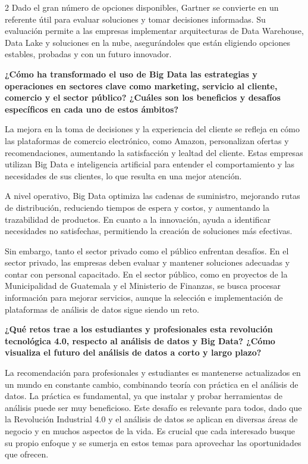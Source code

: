 \documentclass[12pt,spanish,Letterpaper,openany]{book}
\begin{document}
\begin {multicols}{2}
Dado el gran número de opciones disponibles, Gartner se convierte en un referente útil para evaluar soluciones y tomar decisiones informadas. Su evaluación permite a las empresas implementar arquitecturas de Data Warehouse, Data Lake y soluciones en la nube, asegurándoles que están eligiendo opciones estables, probadas y con un futuro innovador.

\textbf{¿Cómo ha transformado el uso de Big Data las estrategias y operaciones en sectores clave como marketing, servicio al cliente, comercio y el sector público? ¿Cuáles son los beneficios y desafíos específicos en cada uno de estos ámbitos?}

La mejora en la toma de decisiones y la experiencia del cliente se refleja en cómo las plataformas de comercio electrónico, como Amazon, personalizan ofertas y recomendaciones, aumentando la satisfacción y lealtad del cliente. Estas empresas utilizan Big Data e inteligencia artificial para entender el comportamiento y las necesidades de sus clientes, lo que resulta en una mejor atención.

A nivel operativo, Big Data optimiza las cadenas de suministro, mejorando rutas de distribución, reduciendo tiempos de espera y costos, y aumentando la trazabilidad de productos. En cuanto a la innovación, ayuda a identificar necesidades no satisfechas, permitiendo la creación de soluciones más efectivas.

Sin embargo, tanto el sector privado como el público enfrentan desafíos. En el sector privado, las empresas deben evaluar y mantener soluciones adecuadas y contar con personal capacitado. En el sector público, como en proyectos de la Municipalidad de Guatemala y el Ministerio de Finanzas, se busca procesar información para mejorar servicios, aunque la selección e implementación de plataformas de análisis de datos sigue siendo un reto.

\textbf{¿Qué retos trae a los estudiantes y profesionales esta revolución tecnológica 4.0, respecto al análisis de datos y Big Data? ¿Cómo visualiza el futuro del análisis de datos a corto y largo plazo?}

La recomendación para profesionales y estudiantes es mantenerse actualizados en un mundo en constante cambio, combinando teoría con práctica en el análisis de datos. La práctica es fundamental, ya que instalar y probar herramientas de análisis puede ser muy beneficioso. Este desafío es relevante para todos, dado que la Revolución Industrial 4.0 y el análisis de datos se aplican en diversas áreas de negocio y en muchos aspectos de la vida. Es crucial que cada interesado busque su propio enfoque y se sumerja en estos temas para aprovechar las oportunidades que ofrecen.


\end{multicols}
\end{document}
